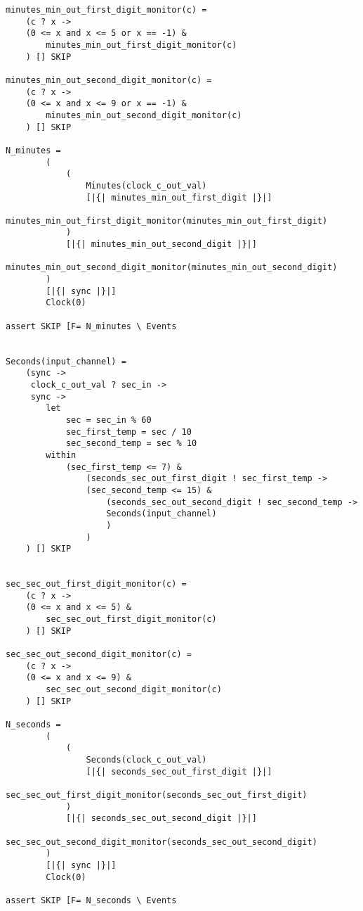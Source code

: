 \begin{verbatim}
minutes_min_out_first_digit_monitor(c) =
    (c ? x ->
    (0 <= x and x <= 5 or x == -1) &
        minutes_min_out_first_digit_monitor(c)
    ) [] SKIP

minutes_min_out_second_digit_monitor(c) =
    (c ? x ->
    (0 <= x and x <= 9 or x == -1) &
        minutes_min_out_second_digit_monitor(c)
    ) [] SKIP

N_minutes =
        (
            (
                Minutes(clock_c_out_val)
                [|{| minutes_min_out_first_digit |}|]
                minutes_min_out_first_digit_monitor(minutes_min_out_first_digit)
            )
            [|{| minutes_min_out_second_digit |}|]
            minutes_min_out_second_digit_monitor(minutes_min_out_second_digit)
        )
        [|{| sync |}|]
        Clock(0)

assert SKIP [F= N_minutes \ Events


Seconds(input_channel) =
    (sync ->
     clock_c_out_val ? sec_in ->
     sync ->
        let
            sec = sec_in % 60
            sec_first_temp = sec / 10
            sec_second_temp = sec % 10
        within
            (sec_first_temp <= 7) &
                (seconds_sec_out_first_digit ! sec_first_temp ->
                (sec_second_temp <= 15) &
                    (seconds_sec_out_second_digit ! sec_second_temp ->
                    Seconds(input_channel)
                    )
                )
    ) [] SKIP


sec_sec_out_first_digit_monitor(c) =
    (c ? x ->
    (0 <= x and x <= 5) &
        sec_sec_out_first_digit_monitor(c)
    ) [] SKIP

sec_sec_out_second_digit_monitor(c) =
    (c ? x ->
    (0 <= x and x <= 9) &
        sec_sec_out_second_digit_monitor(c)
    ) [] SKIP

N_seconds =
        (
            (
                Seconds(clock_c_out_val)
                [|{| seconds_sec_out_first_digit |}|]
                sec_sec_out_first_digit_monitor(seconds_sec_out_first_digit)
            )
            [|{| seconds_sec_out_second_digit |}|]
            sec_sec_out_second_digit_monitor(seconds_sec_out_second_digit)
        )
        [|{| sync |}|]
        Clock(0)

assert SKIP [F= N_seconds \ Events
\end{verbatim}



